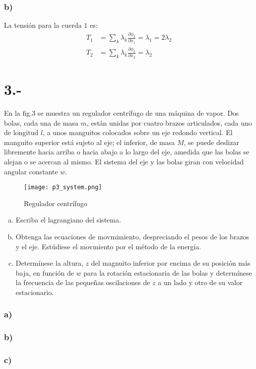 \documentclass{article}
\begin{document}
\begin{tcolorbox}[breakable]
    \subsubsection*{b)}
    La tensión para la cuerda $1$ es:
    \begin{align*}
        T_1 &= \sum_k \lambda_k \frac{\partial \phi_k}{\partial x_1} = \lambda_1 = 2\lambda_2 \\
        T_2 &= \sum_k \lambda_k \frac{\partial \phi_k}{\partial x_2} = \lambda_2
    \end{align*}

\end{tcolorbox}

\section*{3.-}
En la fig.3 se muestra un regulador centrífugo de una máquina de vapor. Dos bolas, cada una de masa $m$, están unidas por cuatro brazos articulados, 
cada uno de longitud $l$, a unos manguitos colocados sobre un eje redondo vertical. El manguito superior está sujeto al eje; el inferior, de masa $M$, 
se puede deslizar libremente hacia arriba o hacia abajo a lo largo del eje, amedida que las bolas se alejan o se acercan al mismo. 
El sistema del eje y las bolas giran con velocidad angular constante $w$.
\begin{figure}[H]
    \centering
    \texttt{[image: p3\_system.png]}
    \caption{Regulador centrífugo}
\end{figure}

\begin{enumerate}[a)]
    \item Escriba el lagrangiano del sistema.
    \item Obtenga las ecuaciones de movmimiento, despreciando el pesos de los brazos y el eje. Estúdiese el movmiento por el método de la energía.
    \item Determínese la altura, $z$ del magnuito inferior por encima de su posición más baja, en función de $w$ para la rotación estacionaria de las bolas 
    y determínese la frecuencia de las pequeñas oscilaciones de $z$ a un lado y otro de su valor estacionario.
\end{enumerate}
\begin{tcolorbox}[breakable]
    \subsubsection*{a)}

    \subsubsection*{b)}
    
    \subsubsection*{c)}

\end{tcolorbox}
\end{document}
